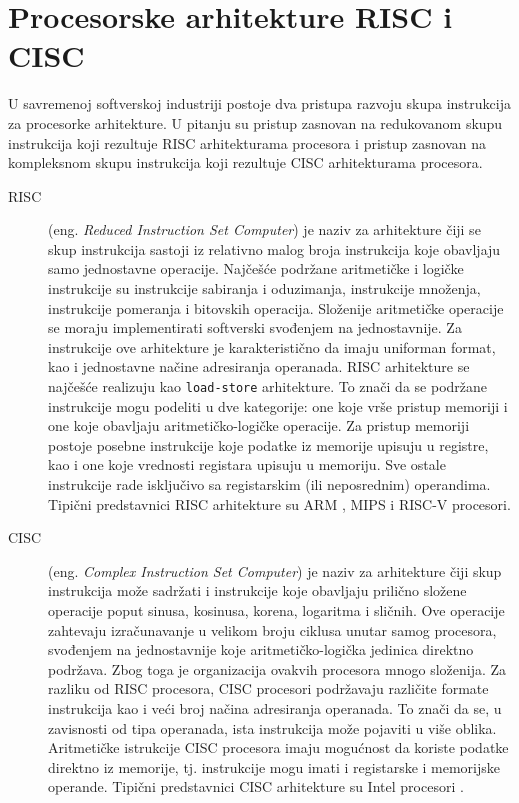 \documentclass[12pt,oneside]{memoir}
\begin{document}
\section{Procesorske arhitekture RISC i CISC}
U savremenoj softverskoj industriji postoje dva pristupa razvoju skupa instrukcija za procesorke arhitekture. U pitanju su pristup zasnovan na redukovanom skupu instrukcija koji rezultuje RISC arhitekturama procesora i pristup zasnovan na kompleksnom skupu instrukcija koji rezultuje CISC arhitekturama procesora. 
\begin{description}
    \item[RISC] 
(eng. \textit{Reduced Instruction Set Computer}) je naziv za arhitekture čiji se skup instrukcija sastoji iz relativno malog broja instrukcija koje obavljaju 
samo jednostavne operacije. Najčešće podržane aritmetičke i logičke instrukcije su 
instrukcije sabiranja i oduzimanja, instrukcije množenja, instrukcije pomeranja i bitovskih operacija. Složenije aritmetičke operacije se moraju implementirati 
softverski svođenjem na jednostavnije. Za instrukcije ove arhitekture je karakteristično da imaju uniforman format, kao i jednostavne načine adresiranja operanada. RISC arhitekture se najčešće realizuju kao \texttt{load-store} arhitekture. To znači da se podržane instrukcije mogu podeliti u dve kategorije: one koje vrše pristup memoriji i one koje obavljaju aritmetičko-logičke operacije.
Za pristup memoriji postoje posebne instrukcije koje podatke iz memorije upisuju u registre, kao i one koje vrednosti registara upisuju u memoriju. Sve ostale instrukcije rade isključivo sa registarskim (ili neposrednim) operandima. Tipični predstavnici RISC arhitekture su ARM \cite{arm_processor}, MIPS \cite{mips_processor} i RISC-V \cite{riscv_processor} procesori.
\item[CISC]
(eng. \textit{Complex Instruction Set Computer}) je naziv za arhitekture čiji skup 
instrukcija može sadržati i instrukcije koje obavljaju prilično složene operacije poput sinusa, kosinusa, korena, logaritma i sličnih. Ove operacije zahtevaju izračunavanje u velikom broju ciklusa unutar samog procesora, svođenjem na jednostavnije koje aritmetičko-logička jedinica direktno podržava. Zbog toga je organizacija ovakvih procesora mnogo složenija. Za razliku od RISC procesora, CISC procesori podržavaju različite formate instrukcija kao i veći broj načina adresiranja operanada. To znači da se, u zavisnosti od tipa operanada, ista instrukcija može pojaviti u više oblika. Aritmetičke istrukcije CISC procesora imaju mogućnost da koriste podatke direktno iz memorije, tj. instrukcije mogu imati i registarske i memorijske operande. Tipični predstavnici CISC arhitekture su Intel procesori \cite{intel_processor}.
\end{description}
\end{document}
